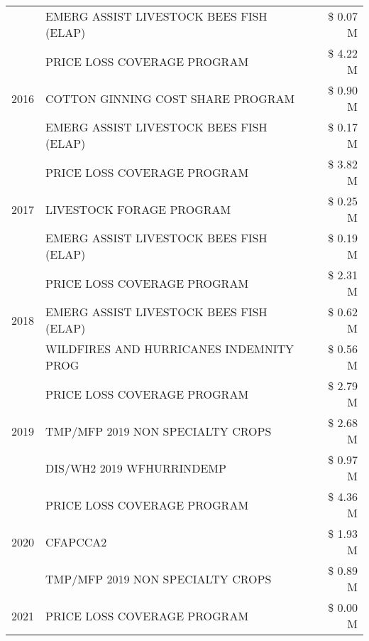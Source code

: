 \begin{tabular}{llr}
 & EMERG ASSIST LIVESTOCK BEES FISH (ELAP) & \$ 0.07 M \\
\cline{1-3}
\multirow[t]{3}{*}{2016} & PRICE LOSS COVERAGE PROGRAM                   & \$ 4.22 M \\
 & COTTON GINNING COST SHARE PROGRAM             & \$ 0.90 M \\
 & EMERG ASSIST LIVESTOCK BEES FISH (ELAP)       & \$ 0.17 M \\
\cline{1-3}
\multirow[t]{3}{*}{2017} & PRICE LOSS COVERAGE PROGRAM & \$ 3.82 M \\
 & LIVESTOCK FORAGE PROGRAM & \$ 0.25 M \\
 & EMERG ASSIST LIVESTOCK BEES FISH (ELAP) & \$ 0.19 M \\
\cline{1-3}
\multirow[t]{3}{*}{2018} & PRICE LOSS COVERAGE PROGRAM & \$ 2.31 M \\
 & EMERG ASSIST LIVESTOCK BEES FISH (ELAP) & \$ 0.62 M \\
 & WILDFIRES AND HURRICANES INDEMNITY PROG & \$ 0.56 M \\
\cline{1-3}
\multirow[t]{3}{*}{2019} & PRICE LOSS COVERAGE PROGRAM & \$ 2.79 M \\
 & TMP/MFP 2019 NON SPECIALTY CROPS & \$ 2.68 M \\
 & DIS/WH2 2019 WFHURRINDEMP & \$ 0.97 M \\
\cline{1-3}
\multirow[t]{3}{*}{2020} & PRICE LOSS COVERAGE PROGRAM & \$ 4.36 M \\
 & CFAPCCA2 & \$ 1.93 M \\
 & TMP/MFP 2019 NON SPECIALTY CROPS & \$ 0.89 M \\
\cline{1-3}
2021 & PRICE LOSS COVERAGE PROGRAM & \$ 0.00 M \\
\cline{1-3}
\bottomrule
\end{tabular}
